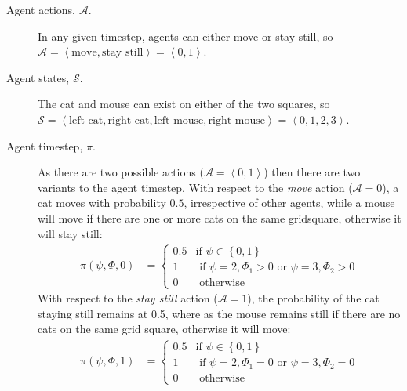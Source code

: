 \documentclass{article}
\begin{document}
\begin{description}

\item[Agent actions, $\mathcal{A}$.] In any given timestep, agents can either move or stay still, so $\mathcal{A} = \left<\textrm{move}, \textrm{stay still}\right> = \left<0, 1\right>$.

\item[Agent states, $\mathcal{S}$.] The cat and mouse can exist on either of the two squares, so $\mathcal{S} = \left<\textrm{left cat}, \textrm{right cat}, \textrm{left mouse}, \textrm{right mouse} \right> = \left<0, 1, 2, 3 \right>$. 

\item[Agent timestep, $\pi$.] As there are two possible actions ($\mathcal{A}=\left<0, 1\right>$) then there are two variants to the agent timestep. With respect to the \textit{move} action ($\mathcal{A}=0$), a cat moves with probability $0.5$, irrespective of other agents, while a mouse will move if there are one or more cats on the same gridsquare, otherwise it will stay still:
\[
\begin{aligned}
\pi(\psi, \Phi, 0) &=   %
\begin{cases}
0.5 & \text{if } \psi \in \left\{0,1\right\}\\  %
1 & \text{ if } \psi = 2, \Phi_1 > 0 \text{ or } \psi=3, \Phi_2 > 0\\ %
0 & \text{ otherwise} %
\end{cases}
\end{aligned}
\]
With respect to the \textit{stay still} action  ($\mathcal{A}=1$), the probability of the cat staying still remains at 0.5, where as the mouse remains still if there are no cats on the same grid square, otherwise it will move:
\[
\begin{aligned}
\pi(\psi, \Phi, 1) &= %
\begin{cases}
0.5 & \text{if } \psi \in \left\{0, 1\right\}\\  %
1 & \text{ if } \psi = 2, \Phi_1 = 0 \text{ or } \psi=3, \Phi_2 = 0\\ %
0 & \text{ otherwise}
\end{cases}
\end{aligned}
\]


\end{description}
\end{document}
